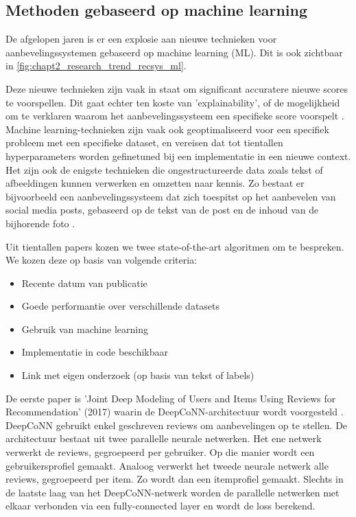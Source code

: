 \subsection{Methoden gebaseerd op machine learning}
De afgelopen jaren is er een explosie aan nieuwe technieken voor aanbevelingssystemen gebaseerd op machine learning (ML). Dit is ook zichtbaar in \autoref{fig:chapt2_research_trend_recsys_ml}.


 Deze nieuwe technieken zijn vaak in staat om significant accuratere nieuwe scores te voorspellen. Dit gaat echter ten koste van 'explainability', of de mogelijkheid om te verklaren waarom het aanbevelingssysteem een specifieke score voorspelt \cite{overzicht_technieken}. Machine learning-technieken zijn vaak ook geoptimaliseerd voor een specifiek probleem met een specifieke dataset, en vereisen dat tot tientallen hyperparameters worden gefinetuned bij een implementatie in een nieuwe context. Het zijn ook de enigste technieken die ongestructureerde data zoals tekst of afbeeldingen kunnen verwerken en omzetten naar kennis. Zo bestaat er bijvoorbeeld een aanbevelingssysteem dat zich toespitst op het aanbevelen van social media posts, gebaseerd op de tekst van de post en de inhoud van de bijhorende foto \cite{recsys_afbeeldingen_social_network}.

 Uit tientallen papers kozen we twee state-of-the-art algoritmen om te bespreken. We kozen deze op basis van volgende criteria:
\begin{itemize}
     \item Recente datum van publicatie
     \item Goede performantie over verschillende datasets
     \item Gebruik van machine learning
     \item Implementatie in code beschikbaar
     \item Link met eigen onderzoek (op basis van tekst of labels)
\end{itemize}

De eerste paper is 'Joint Deep Modeling of Users and Items Using Reviews for Recommendation' (2017) waarin de DeepCoNN-architectuur wordt voorgesteld \cite{deepconn}. DeepCoNN gebruikt enkel geschreven reviews om aanbevelingen op te stellen. De architectuur bestaat uit twee parallelle neurale netwerken. Het ene netwerk verwerkt de reviews, gegroepeerd per gebruiker. Op die manier wordt een gebruikersprofiel gemaakt. Analoog verwerkt het tweede neurale netwerk alle reviews, gegroepeerd per item. Zo wordt dan een itemprofiel gemaakt. Slechts in de laatste laag van het DeepCoNN-netwerk worden de parallelle netwerken met elkaar verbonden via een fully-connected layer en wordt de loss berekend.

